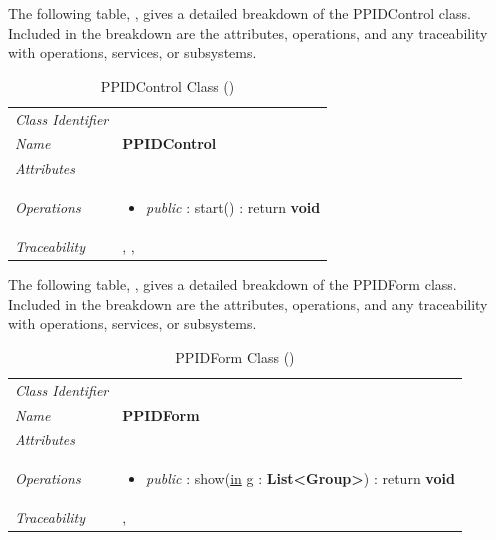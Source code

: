 \documentclass[12pt,letterpaper]{article}
\begin{document}
The following table, , gives a detailed breakdown of the PPIDControl class. Included in the breakdown are the attributes, operations, and any traceability with operations, services, or subsystems.

\begin{table}[H]
    \caption{PPIDControl Class ()} 
	\begin{tabu} to 
		\toprule
		Class Identifier &  \\
		Name & {\bf PPIDControl} \\
		Attributes & \\

		Operations &
		\begin{minipage}[t]{\linewidth}
			\begin{itemize}
			    \item {\it public} : start() : return {\bf void}
	        \end{itemize}
	    \end{minipage} \\
	    	Traceability & , , \\
		\toprule
	\end{tabu}
\end{table}

The following table, , gives a detailed breakdown of the PPIDForm class. Included in the breakdown are the attributes, operations, and any traceability with operations, services, or subsystems.

\begin{table}[H]
    \caption{PPIDForm Class ()} 
	\begin{tabu} to 
		\toprule
		Class Identifier &  \\
		Name & {\bf PPIDForm} \\
		Attributes & \\

		Operations &
		\begin{minipage}[t]{\linewidth}
			\begin{itemize}
			    \item {\it public} : show(\underline{in} g : {\bf List<Group>}) : return {\bf void}
	        \end{itemize}
	    \end{minipage} \\
	    	Traceability & , \\
		\toprule
	\end{tabu}
\end{table}
\end{document}
